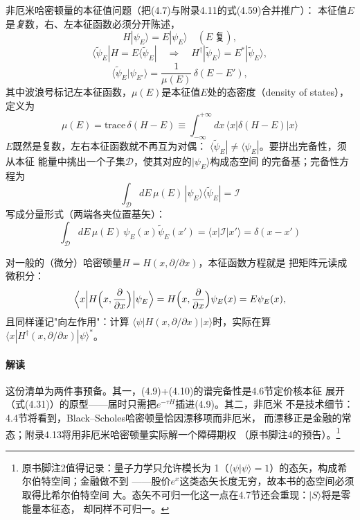 非厄米哈密顿量的本征值问题（把(4.7)与附录4.11的式(4.59)合并推广）：
本征值$E$是\emph{复}数，右、左本征函数必须分开陈述，
\begin{equation*}
H|\psi_{E}\rangle=E|\psi_{E}\rangle
\quad(E\ \text{复}),
\end{equation*}
\begin{equation*}
\langle\tilde{\psi}_{E}|H=E\langle\tilde{\psi}_{E}|
\quad\Longrightarrow\quad
H^{\dagger}|\tilde{\psi}_{E}\rangle=E^{*}|\tilde{\psi}_{E}\rangle,
\end{equation*}
\begin{equation*}
\langle\tilde{\psi}_{E}|\psi_{E'}\rangle
=\frac{1}{\mu(E)}\,\delta(E-E'),
\end{equation*}
其中波浪号标记左本征函数，$\mu(E)$是本征值$E$处的态密度（density of
states），定义为
\begin{equation*}
\mu(E)=\mathrm{trace}\,\delta(H-E)
\equiv\int_{-\infty}^{+\infty}dx\,\langle x|\delta(H-E)|x\rangle
\tag{4.8}
\end{equation*}
$E$既然是复数，左右本征函数就不再互为对偶：
$\langle\tilde{\psi}_{E}|\neq\langle\psi_{E}|$。要拼出完备性，须从本征
能量中挑出一个子集$\mathcal{D}$，使其对应的$|\psi_{E}\rangle$构成态空间
的完备基；完备性方程为
\begin{equation*}
\int_{\mathcal{D}}dE\,\mu(E)\,|\psi_{E}\rangle\langle\tilde{\psi}_{E}|
=\mathcal{I}
\tag{4.9}
\end{equation*}
写成分量形式（两端各夹位置基矢）：
\begin{equation*}
\int_{\mathcal{D}}dE\,\mu(E)\,\psi_{E}(x)\tilde{\psi}_{E}(x')
=\langle x|\mathcal{I}|x'\rangle=\delta(x-x')
\tag{4.10}
\end{equation*}

对一般的（微分）哈密顿量$H=H(x,\partial/\partial x)$，本征函数方程就是
把矩阵元读成微积分：
\begin{equation*}
\Bigl\langle x\Bigl|H\Bigl(x,\frac{\partial}{\partial x}\Bigr)
\Bigr|\psi_{E}\Bigr\rangle
=H\Bigl(x,\frac{\partial}{\partial x}\Bigr)\psi_{E}(x)=E\psi_{E}(x),
\end{equation*}
且同样谨记"向左作用"：计算
$\langle\psi|H(x,\partial/\partial x)|x\rangle$时，实际在算
$\langle x|H^{\dagger}(x,\partial/\partial x)|\psi\rangle^{*}$。

\paragraph{解读}
这份清单为两件事预备。其一，(4.9)+(4.10)的谱完备性是4.6节定价核本征
展开（式(4.31)）的原型——届时只需把$e^{-\tau H}$插进(4.9)。其二，非厄米
不是技术细节：4.4节将看到，Black--Scholes哈密顿量恰因漂移项而非厄米，
而漂移正是金融的常态；附录4.13将用非厄米哈密顿量实际解一个障碍期权
（原书脚注4的预告）。\footnote{原书脚注2值得记录：量子力学只允许模长为
1（$\langle\psi|\psi\rangle=1$）的态矢，构成希尔伯特空间；金融做不到
——股价$e^{x}$这类态矢长度无穷，故本书的态空间必须取得比希尔伯特空间
大。态矢不可归一化这一点在4.7节还会重现：$|S\rangle$将是零能量本征态，
却同样不可归一。}

